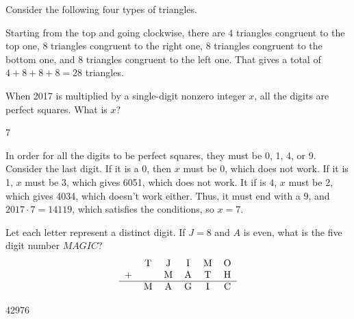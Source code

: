 \documentclass[11pt]{article}
\begin{document}
\begin{solution}
Consider the following four types of triangles.
\begin{center}
    \end{center}
Starting from the top and going clockwise, there are $4$ triangles congruent to the top one, $8$ triangles congruent to the right one,
$8$ triangles congruent to the bottom one, and $8$ triangles congruent to the left one. That gives a total of $4 + 8 + 8 + 8 = \boxed{28}$ triangles.
\end{solution}


\begin{problem}
When 2017 is multiplied by a single-digit nonzero integer $x$, all the digits are perfect squares. What is $x$?
\end{problem}

\begin{answer}
7
\end{answer}

\begin{solution}
In order for all the digits to be perfect squares, they must be 0, 1, 4, or 9. Consider the last digit. If it is a 0, then $x$ must be 0, which does not work. If it is 1, $x$ must be 3, which gives 6051, which does not work. It if is $4$, $x$ must be 2, which gives 4034, which doesn't work either. Thus, it must end with a 9, and $2017\cdot7=14119$, which satisfies the conditions, so $x=\boxed{7}$.
\end{solution}


\begin{problem}
Let each letter represent a distinct digit. If $J=8$ and $A$ is even, what is the five digit number $MAGIC$?
\[
    \begin{tabular}{c c c c c c}
        & T & J & I & M & O \\
        + & & M & A & T & H \\
        \hline
        & M & A & G & I & C
    \end{tabular}
\]
\end{problem}

\begin{answer}
42976
\end{answer}
\end{document}
